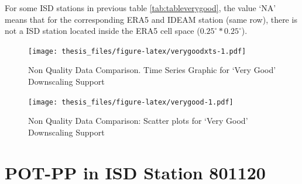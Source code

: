 \documentclass[12pt,oneside]{reedthesis}
\begin{document}
For some ISD stations in previous table \ref{tab:tableverygood}, the value `NA' means that for the corresponding ERA5 and IDEAM station (same row), there is not a ISD station located inside the ERA5 cell space (\(0.25^\circ * 0.25^\circ\)).
\begin{figure}
\centering
\texttt{[image: thesis\_files/figure-latex/verygoodxts-1.pdf]}
\caption{\label{fig:verygoodxts}Non Quality Data Comparison. Time Series Graphic for `Very Good' Downscaling Support}
\end{figure}
\begin{figure}
\centering
\texttt{[image: thesis\_files/figure-latex/verygood-1.pdf]}
\caption{\label{fig:verygood}Non Quality Data Comparison: Scatter plots for `Very Good' Downscaling Support}
\end{figure}
\hypertarget{pot-pp-in-isd-station-801120}{%
\section{POT-PP in ISD Station 801120}\label{pot-pp-in-isd-station-801120}}
\end{document}
